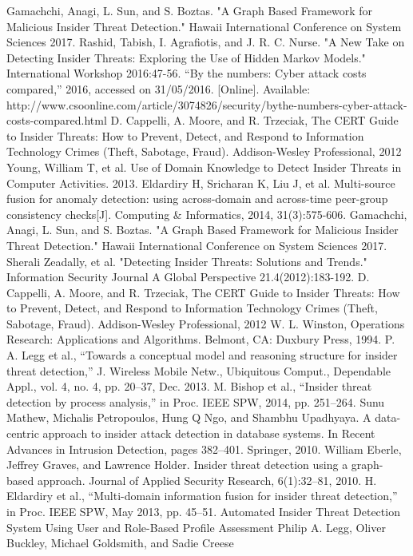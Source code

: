 \documentclass[conference]{IEEEtran}
\begin{document}
\begin{thebibliography}{00}
 Gamachchi, Anagi, L. Sun, and S. Boztas. "A Graph Based Framework for Malicious Insider Threat Detection." Hawaii International Conference on System Sciences 2017.
 Rashid, Tabish, I. Agrafiotis, and J. R. C. Nurse. "A New Take on Detecting Insider Threats: Exploring the Use of Hidden Markov Models." International Workshop 2016:47-56.
 “By the numbers: Cyber attack costs compared,” 2016, accessed on 31/05/2016. [Online]. Available: http://www.csoonline.com/article/3074826/security/bythe-numbers-cyber-attack-costs-compared.html
  D. Cappelli, A. Moore, and R. Trzeciak, The CERT Guide to Insider Threats: How to Prevent, Detect, and Respond to Information Technology Crimes (Theft, Sabotage, Fraud). Addison-Wesley Professional, 2012
 Young, William T, et al. Use of Domain Knowledge to Detect Insider Threats in Computer Activities.  2013.
Eldardiry H, Sricharan K, Liu J, et al. Multi-source fusion for anomaly detection: using across-domain and across-time peer-group consistency checks[J]. Computing \& Informatics, 2014, 31(3):575-606.
 Gamachchi, Anagi, L. Sun, and S. Boztas. "A Graph Based Framework for Malicious Insider Threat Detection." Hawaii International Conference on System Sciences 2017.
 Sherali   Zeadally, et al. "Detecting Insider Threats: Solutions and Trends." Information Security Journal A Global Perspective 21.4(2012):183-192.
  D. Cappelli, A. Moore, and R. Trzeciak, The CERT Guide to Insider Threats: How to Prevent, Detect, and Respond
to Information Technology Crimes (Theft, Sabotage, Fraud). Addison-Wesley Professional, 2012
W. L. Winston, Operations Research: Applications and Algorithms. Belmont, CA: Duxbury Press, 1994.
  P. A. Legg et al., “Towards a conceptual model and reasoning structure for insider threat detection,” J. Wireless Mobile Netw., Ubiquitous Comput., Dependable Appl., vol. 4, no. 4, pp. 20–37, Dec. 2013.
 M. Bishop et al., “Insider threat detection by process analysis,” in Proc. IEEE SPW, 2014, pp. 251–264.
 Sunu Mathew, Michalis Petropoulos, Hung Q Ngo, and Shambhu Upadhyaya. A data-centric approach to insider attack detection in database systems. In Recent Advances in Intrusion Detection, pages 382–401. Springer, 2010.
 William Eberle, Jeffrey Graves, and Lawrence Holder. Insider threat detection using a graph-based approach. Journal of Applied Security Research, 6(1):32–81, 2010.
 H. Eldardiry et al., “Multi-domain information fusion for insider threat detection,” in Proc. IEEE SPW, May 2013, pp. 45–51.
Automated Insider Threat Detection System Using User and Role-Based Profile Assessment Philip A. Legg, Oliver Buckley, Michael Goldsmith, and Sadie Creese



\end{thebibliography}
\end{document}
